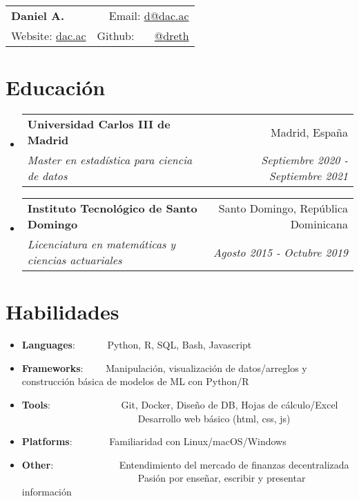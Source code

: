 \documentclass[a4paper,20pt]{article}
\makeatletter
\newcommand{\resumeItem}[2]{
  \item\small{
    \textbf{#1}{: #2 \vspace{-2pt}}
  }
}
\newcommand{\resumeSubheading}[4]{
  \vspace{-1pt}\item
    \begin{tabular*}{0.97\textwidth}{l@{\extracolsep{\fill}}r}
      \textbf{#1} & #2 \\
      \textit{#3} & \textit{#4} \\
    \end{tabular*}\vspace{-5pt}
}
\newcommand{\resumeSubItem}[2]{\resumeItem{#1}{#2}\vspace{-3pt}}
\newcommand{\resumeSubHeadingListStart}{\begin{itemize}[leftmargin=*]}
\newcommand{\resumeSubHeadingListEnd}{\end{itemize}}
\makeatother
\begin{document}
\begin{tabular*}{\textwidth}{l@{\extracolsep{\fill}}r}
  \textbf{{\LARGE Daniel A.}} & Email: {\color{blue}\href{mailto:}{d@dac.ac}}\\
  Website: {\color{blue}\href{https://dac.ac}{dac.ac}} & Github: ~~~{\color{blue}\href{https://github.com/dreth}{@dreth}}
\end{tabular*}




            
\vspace{-4pt}
\section{Educación}
\resumeSubHeadingListStart
        
  \resumeSubheading
    {Universidad Carlos III de Madrid}{Madrid, España}
    {Master en estadística para ciencia de datos}{Septiembre 2020 - Septiembre 2021}
\vspace{-2pt}
  \resumeSubheading
    {Instituto Tecnológico de Santo Domingo}{Santo Domingo, República Dominicana}
    {Licenciatura en matemáticas y ciencias actuariales}{Agosto 2015 - Octubre 2019}
\resumeSubHeadingListEnd


            
\vspace{-7pt}
\section{Habilidades}
  \resumeSubHeadingListStart
            
        
\vspace{-2pt}
\resumeSubItem{Languages}{~~~~~~Python, R, SQL, Bash, Javascript}
\vspace{-2pt}
\resumeSubItem{Frameworks}{~~~~Manipulación, visualización de datos/arreglos y construcción básica de modelos de ML con Python/R}
\vspace{-2pt}
\resumeSubItem{Tools}{~~~~~~~~~~~~~~Git, Docker, Diseño de DB, Hojas de cálculo/Excel\\ ~~~~~~~~~~~~~~~~~~~~~~~~Desarrollo web básico (html, css, js)}
\vspace{-2pt}
\resumeSubItem{Platforms}{~~~~~~~Familiaridad con Linux/macOS/Windows}
\vspace{-2pt}
\resumeSubItem{Other}{~~~~~~~~~~~~~Entendimiento del mercado de finanzas decentralizada\\ ~~~~~~~~~~~~~~~~~~~~~~~~Pasión por enseñar, escribir y presentar información}
\resumeSubHeadingListEnd
\end{document}
